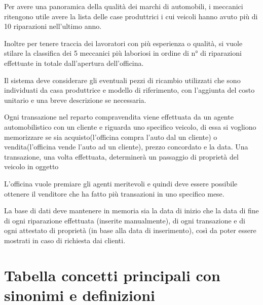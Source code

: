 \documentclass[a4paper,12pt]{report}
\begin{document}
Per avere una panoramica della qualità dei marchi di automobili, i meccanici ritengono utile avere la lista delle 
%
case produttrici i cui veicoli hanno avuto più di 10 riparazioni nell'ultimo anno.

Inoltre per tenere traccia dei lavoratori con più esperienza o qualità, si vuole stilare la classifica dei 5 meccanici
%
più laboriosi in ordine di n° di riparazioni effettuate in totale dall'apertura dell'officina.

Il sistema deve considerare gli eventuali pezzi di ricambio utilizzati che sono individuati da 
%
casa produttrice e modello di riferimento, con l'aggiunta del costo unitario e una breve descrizione se necessaria.

Ogni transazione nel reparto compravendita viene effettuata da un agente automobilistico con un cliente 
%
e riguarda uno specifico veicolo, di essa si vogliono memorizzare se sia acquisto(l'officina compra l'auto 
%
dal un cliente) o vendita(l'officina vende l'auto ad un cliente), prezzo concordato e la data. 
% 
Una transazione, una volta effettuata, determinerà un passaggio di proprietà del veicolo in oggetto

L'officina vuole premiare gli agenti meritevoli e quindi deve essere possibile ottenere il venditore che ha fatto
%
più transazioni in uno specifico mese. 

La base di dati deve mantenere in memoria sia la data di inizio che la data di fine di ogni riparazione effettuata
% 
(inserite manualmente), di ogni transazione e di ogni attestato di proprietà (in base alla data di inserimento),
%
così da poter essere mostrati in caso di richiesta dai clienti.

\section{Tabella concetti principali con sinonimi e definizioni}
\end{document}
